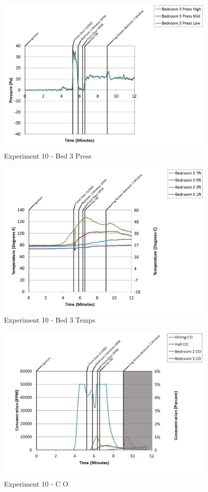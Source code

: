 \documentclass{article}
\begin{document}
\begin{appendices}
	\begin{figure}[h!]
		\centering
		\includegraphics[height=3.05in]{0_Images/Results_Charts/Exp_10_Charts/Bed3Press.pdf}
		\caption{Experiment 10 - Bed 3 Press}
	\end{figure}
 
	\clearpage

	\begin{figure}[h!]
		\centering
		\includegraphics[height=3.05in]{0_Images/Results_Charts/Exp_10_Charts/Bed3Temps.pdf}
		\caption{Experiment 10 - Bed 3 Temps}
	\end{figure}
 

	\begin{figure}[h!]
		\centering
		\includegraphics[height=3.05in]{0_Images/Results_Charts/Exp_10_Charts/CO.pdf}
		\caption{Experiment 10 - C O}
	\end{figure}
 

\end{appendices}
\end{document}
